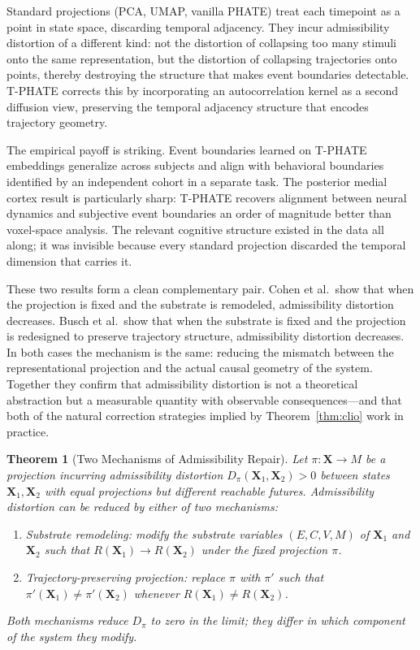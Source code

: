 \documentclass[12pt,a4paper]{article}
\newtheorem{theorem}{Theorem}[section]
\begin{document}
Standard projections (PCA, UMAP, vanilla PHATE) treat each timepoint as a point in state space, discarding temporal adjacency. They incur admissibility distortion of a different kind: not the distortion of collapsing too many stimuli onto the same representation, but the distortion of collapsing trajectories onto points, thereby destroying the structure that makes event boundaries detectable. T-PHATE corrects this by incorporating an autocorrelation kernel as a second diffusion view, preserving the temporal adjacency structure that encodes trajectory geometry.

The empirical payoff is striking. Event boundaries learned on T-PHATE embeddings generalize across subjects and align with behavioral boundaries identified by an independent cohort in a separate task. The posterior medial cortex result is particularly sharp: T-PHATE recovers alignment between neural dynamics and subjective event boundaries an order of magnitude better than voxel-space analysis. The relevant cognitive structure existed in the data all along; it was invisible because every standard projection discarded the temporal dimension that carries it.

These two results form a clean complementary pair. Cohen et al.\ show that when the projection is fixed and the substrate is remodeled, admissibility distortion decreases. Busch et al.\ show that when the substrate is fixed and the projection is redesigned to preserve trajectory structure, admissibility distortion decreases. In both cases the mechanism is the same: reducing the mismatch between the representational projection and the actual causal geometry of the system. Together they confirm that admissibility distortion is not a theoretical abstraction but a measurable quantity with observable consequences---and that both of the natural correction strategies implied by Theorem~\ref{thm:clio} work in practice.

\begin{theorem}[Two Mechanisms of Admissibility Repair]
\label{thm:repair-mechanisms}
Let $\pi: \mathbf{X} \to M$ be a projection incurring admissibility distortion $D_\pi(\mathbf{X}_1, \mathbf{X}_2) > 0$ between states $\mathbf{X}_1, \mathbf{X}_2$ with equal projections but different reachable futures. Admissibility distortion can be reduced by either of two mechanisms:
\begin{enumerate}
  \item \emph{Substrate remodeling}: modify the substrate variables $(E, C, V, M)$ of $\mathbf{X}_1$ and $\mathbf{X}_2$ such that $R(\mathbf{X}_1) \to R(\mathbf{X}_2)$ under the fixed projection $\pi$.
  \item \emph{Trajectory-preserving projection}: replace $\pi$ with $\pi'$ such that $\pi'(\mathbf{X}_1) \neq \pi'(\mathbf{X}_2)$ whenever $R(\mathbf{X}_1) \neq R(\mathbf{X}_2)$.
\end{enumerate}
Both mechanisms reduce $D_\pi$ to zero in the limit; they differ in which component of the system they modify.
\end{theorem}
\end{document}

